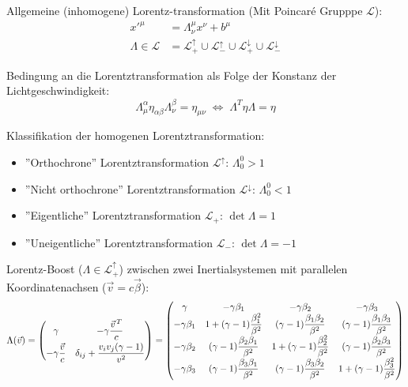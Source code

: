 \documentclass[11pt]{article}
\numberwithin{equation}{section}
\begin{document}
				\noindent
				Allgemeine (inhomogene) Lorentz-transformation (Mit Poincaré Grupppe $\mathcal{L}$):
				\begin{equation}
					\begin{aligned}
						x'^\mu &= \Lambda^\mu_{\nu} x^\nu + b^\mu \\
						\Lambda \in \mathcal{L} &= \mathcal{L}^\uparrow_+ \cup \mathcal{L}^\uparrow_- \cup \mathcal{L}^\downarrow_+ \cup \mathcal{L}^\downarrow_-
					\end{aligned}
				\end{equation}

				\noindent
				Bedingung an die Lorentztransformation als Folge der Konstanz der Lichtgeschwindigkeit:
				\begin{equation}
					\Lambda^{\alpha}_{\mu} \eta_{\alpha\beta} \Lambda^{\beta}_{\nu} = \eta_{\mu\nu}
					 \;\Leftrightarrow\; \Lambda^T \eta \Lambda = \eta
				\end{equation}

				\noindent
				Klassifikation der homogenen Lorentztransformation:
				\begin{itemize}
					\item ''Orthochrone'' Lorentztransformation $\mathcal{L}^\uparrow$: $\Lambda^0_0 > 1$
					\item ''Nicht orthochrone'' Lorentztransformation $\mathcal{L}^\downarrow$: $\Lambda^0_0 < 1$
					\item ''Eigentliche'' Lorentztransformation $\mathcal{L}_+$: $\det\Lambda = 1$
					\item ''Uneigentliche'' Lorentztransformation $\mathcal{L}_-$: $\det\Lambda = -1$
				\end{itemize}

				\noindent
				Lorentz-Boost ($\Lambda\in\mathcal{L}^\uparrow_+$) zwischen zwei Inertialsystemen mit parallelen Koordinatenachsen ($\vec{v}=c\vec{\beta}$):
				\begin{equation}
					\Lambda(\vec{v}) = \left( \begin{matrix}
						\gamma & -\gamma\dfrac{\pvec{v}^T}{c} \\[6pt]
						-\gamma\dfrac{\vec{v}}{c} & \delta_{ij}+\dfrac{v_i v_j(\gamma-1)}{v^2}
						\end{matrix} \right)
						=
						\left(\begin{matrix}
							\gamma & -\gamma \beta_1 & -\gamma \beta_2 & -\gamma \beta_3 \\
							-\gamma \beta_1 & 1+(\gamma -1){\dfrac {\beta_1^{2}}{\beta^{2}}} & (\gamma -1){\dfrac {\beta_1 \beta_2}{\beta^{2}}}&(\gamma -1){\dfrac {\beta_1\beta_3}{\beta^{2}}} \\
							-\gamma \beta_2 & (\gamma -1){\dfrac {\beta_2\beta_1}{\beta^{2}}} & 1+(\gamma -1){\dfrac {\beta_2^{2}}{\beta^{2}}}&(\gamma -1){\dfrac {\beta_2 \beta_3}{\beta^{2}}} \\
							-\gamma \beta_3 &(\gamma -1){\dfrac {\beta_3\beta_1}{\beta^{2}}}&(\gamma -1){\dfrac {\beta_3\beta_2}{\beta^{2}}}&1+(\gamma -1){\dfrac {\beta_3^{2}}{\beta^{2}}}
						\end{matrix}\right)
				\end{equation}
\end{document}
